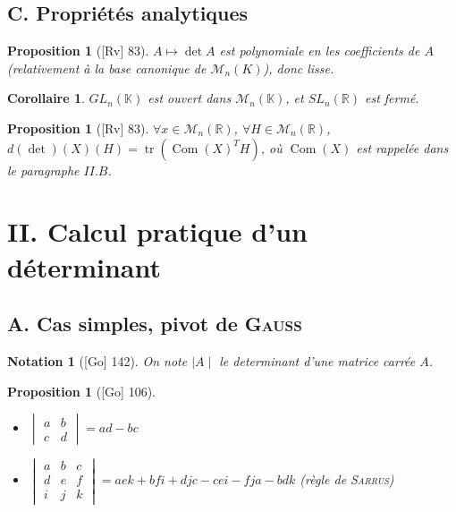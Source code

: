 \documentclass[10pt, a4paper, parskip=full, twoside, twocolumn]{report}
\newtheorem{proposition}[definition]{Proposition}
\newtheorem{corollary}[definition]{Corollaire}
\newtheorem{notation}[definition]{Notation}
\newcommand{\IK}{\mathbb{K}}
\newcommand{\IR}{\mathbb{R}}
\DeclareMathOperator{\tr}{tr}
\DeclareMathOperator{\Com}{Com}
\begin{document}
\subsection*{C. Propriétés analytiques}
\begin{proposition}[\textnormal{[Rv] 83}]
	$A\mapsto \det A$ est polynomiale en les coefficients de $A$ (relativement à la base canonique de $\mathcal{M}_n(K)$), donc lisse.
\end{proposition}

\begin{corollary}
	$GL_n(\IK)$ est ouvert dans $\mathcal{M}_n(\IK)$, et $SL_n(\IR)$ est fermé.
\end{corollary}

\begin{proposition}[\textnormal{[Rv] 83}]
	$\forall x\in \mathcal{M}_n(\IR)$, $\forall H\in \mathcal{M}_n(\IR)$, $d(\det)(X)(H) = \tr (\Com(X)^T H)$,
	où $\Com(X)$ est rappelée dans le paragraphe $II. B$.
\end{proposition}

\section*{II. Calcul pratique d'un déterminant}
\subsection*{A. Cas simples, pivot de \textsc{Gauss}}

\begin{notation}[\textnormal{[Go] 142}]
	On note $\mid A\mid$ le determinant d'une matrice carrée $A$.
\end{notation}

\begin{proposition}[\textnormal{[Go] 106}]
	\begin{itemize}
		\item $\begin{vmatrix}
			a & b \\ c & d
		\end{vmatrix} = ad - bc$
		\item $\begin{vmatrix}
			a & b & c \\ d & e & f \\ i & j & k
		\end{vmatrix} = aek+bfi+djc -cei-fja-bdk$ (règle de \textsc{Sarrus})
	\end{itemize}	
\end{proposition}
\end{document}
